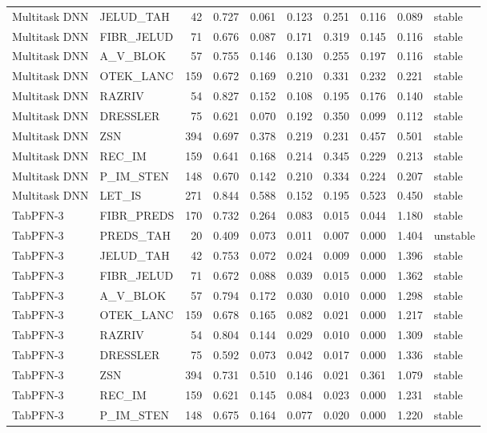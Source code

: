 \begin{longtable}{llrrrrrrrl}
Multitask DNN & JELUD\_TAH & 42 & 0.727 & 0.061 & 0.123 & 0.251 & 0.116 & 0.089 & stable \\
Multitask DNN & FIBR\_JELUD & 71 & 0.676 & 0.087 & 0.171 & 0.319 & 0.145 & 0.116 & stable \\
Multitask DNN & A\_V\_BLOK & 57 & 0.755 & 0.146 & 0.130 & 0.255 & 0.197 & 0.116 & stable \\
Multitask DNN & OTEK\_LANC & 159 & 0.672 & 0.169 & 0.210 & 0.331 & 0.232 & 0.221 & stable \\
Multitask DNN & RAZRIV & 54 & 0.827 & 0.152 & 0.108 & 0.195 & 0.176 & 0.140 & stable \\
Multitask DNN & DRESSLER & 75 & 0.621 & 0.070 & 0.192 & 0.350 & 0.099 & 0.112 & stable \\
Multitask DNN & ZSN & 394 & 0.697 & 0.378 & 0.219 & 0.231 & 0.457 & 0.501 & stable \\
Multitask DNN & REC\_IM & 159 & 0.641 & 0.168 & 0.214 & 0.345 & 0.229 & 0.213 & stable \\
Multitask DNN & P\_IM\_STEN & 148 & 0.670 & 0.142 & 0.210 & 0.334 & 0.224 & 0.207 & stable \\
Multitask DNN & LET\_IS & 271 & 0.844 & 0.588 & 0.152 & 0.195 & 0.523 & 0.450 & stable \\
TabPFN-3 & FIBR\_PREDS & 170 & 0.732 & 0.264 & 0.083 & 0.015 & 0.044 & 1.180 & stable \\
TabPFN-3 & PREDS\_TAH & 20 & 0.409 & 0.073 & 0.011 & 0.007 & 0.000 & 1.404 & unstable \\
TabPFN-3 & JELUD\_TAH & 42 & 0.753 & 0.072 & 0.024 & 0.009 & 0.000 & 1.396 & stable \\
TabPFN-3 & FIBR\_JELUD & 71 & 0.672 & 0.088 & 0.039 & 0.015 & 0.000 & 1.362 & stable \\
TabPFN-3 & A\_V\_BLOK & 57 & 0.794 & 0.172 & 0.030 & 0.010 & 0.000 & 1.298 & stable \\
TabPFN-3 & OTEK\_LANC & 159 & 0.678 & 0.165 & 0.082 & 0.021 & 0.000 & 1.217 & stable \\
TabPFN-3 & RAZRIV & 54 & 0.804 & 0.144 & 0.029 & 0.010 & 0.000 & 1.309 & stable \\
TabPFN-3 & DRESSLER & 75 & 0.592 & 0.073 & 0.042 & 0.017 & 0.000 & 1.336 & stable \\
TabPFN-3 & ZSN & 394 & 0.731 & 0.510 & 0.146 & 0.021 & 0.361 & 1.079 & stable \\
TabPFN-3 & REC\_IM & 159 & 0.621 & 0.145 & 0.084 & 0.023 & 0.000 & 1.231 & stable \\
TabPFN-3 & P\_IM\_STEN & 148 & 0.675 & 0.164 & 0.077 & 0.020 & 0.000 & 1.220 & stable \\

\end{longtable}
